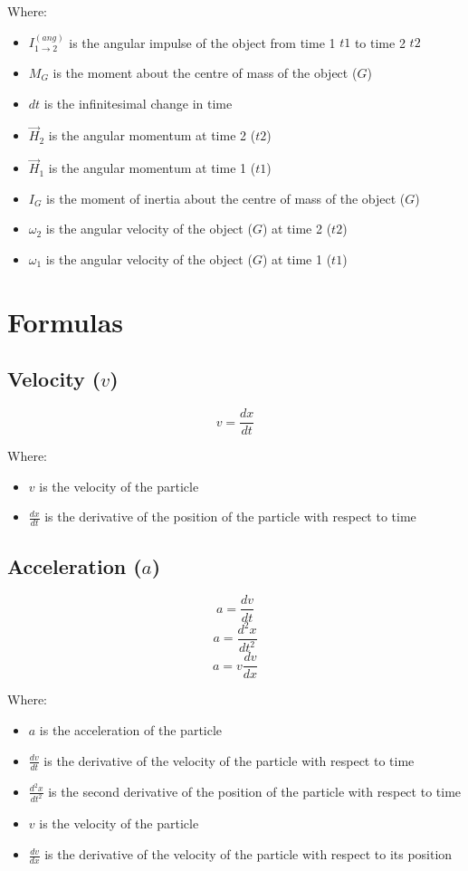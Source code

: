 \documentclass[11pt]{article}
\begin{document}
Where:
\begin{itemize}
\item \(I_{1 \rightarrow 2}^{(ang)}\) is the angular impulse of the object from time 1 \(t1\) to time 2 \(t2\)
\item \(M_G\) is the moment about the centre of mass of the object (\(G\))
\item \(dt\) is the infinitesimal change in time
\item \(\vec{H}_2\) is the angular momentum at time 2 (\(t2\))
\item \(\vec{H}_1\) is the angular momentum at time 1 (\(t1\))
\item \(I_G\) is the moment of inertia about the centre of mass of the object (\(G\))
\item \(\omega_{2}\) is the angular velocity of the object (\(G\)) at time 2 (\(t2\))
\item \(\omega_{1}\) is the angular velocity of the object (\(G\)) at time 1 (\(t1\))
\end{itemize}

 \newpage
\section{Formulas}
\label{sec:org5f4175f}

\subsection{Velocity (\(v\))}
\label{sec:orgec5ecc6}
\[v = \frac{dx}{dt}\]

Where:
\begin{itemize}
\item \(v\) is the velocity of the particle
\item \(\frac{dx}{dt}\) is the derivative of the position of the particle with respect to time
\end{itemize}
\subsection{Acceleration (\(a\))}
\label{sec:org978da93}
\[a = \frac{dv}{dt}\]
\[a = \frac{d^2x}{dt^2}\]
\[a = v \frac{dv}{dx}\]

Where:
\begin{itemize}
\item \(a\) is the acceleration of the particle
\item \(\frac{dv}{dt}\) is the derivative of the velocity of the particle with respect to time
\item \(\frac{d^2x}{dt^2}\) is the second derivative of the position of the particle with respect to time
\item \(v\) is the velocity of the particle
\item \(\frac{dv}{dx}\) is the derivative of the velocity of the particle with respect to its position
\end{itemize}
\end{document}
